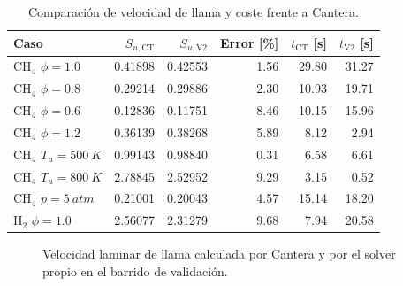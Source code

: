 \documentclass[12pt,a4paper]{article}
\begin{document}
\begin{table}[H]
  \centering
  \caption{Comparación de velocidad de llama y coste frente a Cantera.}
  \label{tab:sweep}
  \small
  \begin{tabular}{lrrrrr}
    \toprule
    Caso & $S_{u,\mathrm{CT}}$ & $S_{u,\mathrm{V2}}$ & Error [\%] & $t_\mathrm{CT}$ [s] & $t_\mathrm{V2}$ [s]\\
    \midrule
    CH$_4$ $\phi=1.0$ & 0.41898 & 0.42553 & 1.56 & 29.80 & 31.27\\
    CH$_4$ $\phi=0.8$ & 0.29214 & 0.29886 & 2.30 & 10.93 & 19.71\\
    CH$_4$ $\phi=0.6$ & 0.12836 & 0.11751 & 8.46 & 10.15 & 15.96\\
    CH$_4$ $\phi=1.2$ & 0.36139 & 0.38268 & 5.89 & 8.12 & 2.94\\
    CH$_4$ $T_u=\SI{500}{K}$ & 0.99143 & 0.98840 & 0.31 & 6.58 & 6.61\\
    CH$_4$ $T_u=\SI{800}{K}$ & 2.78845 & 2.52952 & 9.29 & 3.15 & 0.52\\
    CH$_4$ $p=\SI{5}{atm}$ & 0.21001 & 0.20043 & 4.57 & 15.14 & 18.20\\
    H$_2$ $\phi=1.0$ & 2.56077 & 2.31279 & 9.68 & 7.94 & 20.58\\
    \bottomrule
  \end{tabular}
\end{table}

\begin{figure}[H]
  \centering
  \caption{Velocidad laminar de llama calculada por Cantera y por el solver propio en el barrido de validación.}
  \label{fig:su_cases}
\end{figure}
\end{document}
